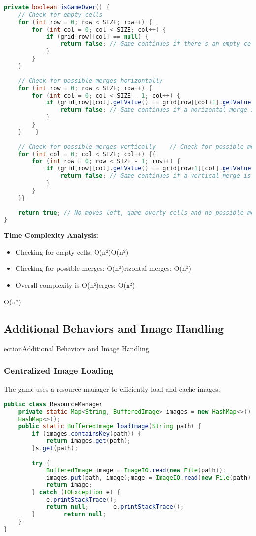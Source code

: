 \documentclass[12pt, a4paper]{article}
\begin{document}
\begin{lstlisting}[language=Java, caption=Game Over Detection]
private boolean isGameOver() {
    // Check for empty cells
    for (int row = 0; row < SIZE; row++) {
        for (int col = 0; col < SIZE; col++) {
            if (grid[row][col] == null) {
                return false; // Game continues if there's an empty cell
            }
        }
    }
    
    // Check for possible merges horizontally
    for (int row = 0; row < SIZE; row++) {
        for (int col = 0; col < SIZE - 1; col++) {
            if (grid[row][col].getValue() == grid[row][col+1].getValue()) {
                return false; // Game continues if a horizontal merge is possible
            }
        }
    }    }
    
    // Check for possible merges vertically    // Check for possible merges vertically
    for (int col = 0; col < SIZE; col++) {{
        for (int row = 0; row < SIZE - 1; row++) {
            if (grid[row][col].getValue() == grid[row+1][col].getValue()) {            if (grid[row][col].getValue() == grid[row+1][col].getValue()) {
                return false; // Game continues if a vertical merge is possiblege is possible
            }
        }
    }}
    
    return true; // No moves left, game overty cells and no possible merges
}
\end{lstlisting}

\textbf{Time Complexity Analysis:}
\begin{itemize}
    \item Checking for empty cells: O(n²)O(n²)
    \item Checking for possible merges: O(n²)rizontal merges: O(n²)
    \item Overall complexity is O(n²)erges: O(n²)
\end{itemize}O(n²)

\subsection{Additional Behaviors and Image Handling}
ection{Additional Behaviors and Image Handling}
\subsubsection{Centralized Image Loading}
The game uses a resource manager to efficiently load and cache images:
\begin{lstlisting}[language=Java, caption=Image Resource Manager]
public class ResourceManager
    private static Map<String, BufferedImage> images = new HashMap<>(); {
    HashMap<>();
    public static BufferedImage loadImage(String path) {    
        if (images.containsKey(path)) {
            return images.get(path);
        }s.get(path);
        
        try {    
            BufferedImage image = ImageIO.read(new File(path));
            images.put(path, image);mage = ImageIO.read(new File(path));
            return image;
        } catch (IOException e) {
            e.printStackTrace();
            return null;       e.printStackTrace();
        }        return null;
    }
}
\end{lstlisting}
\end{document}
